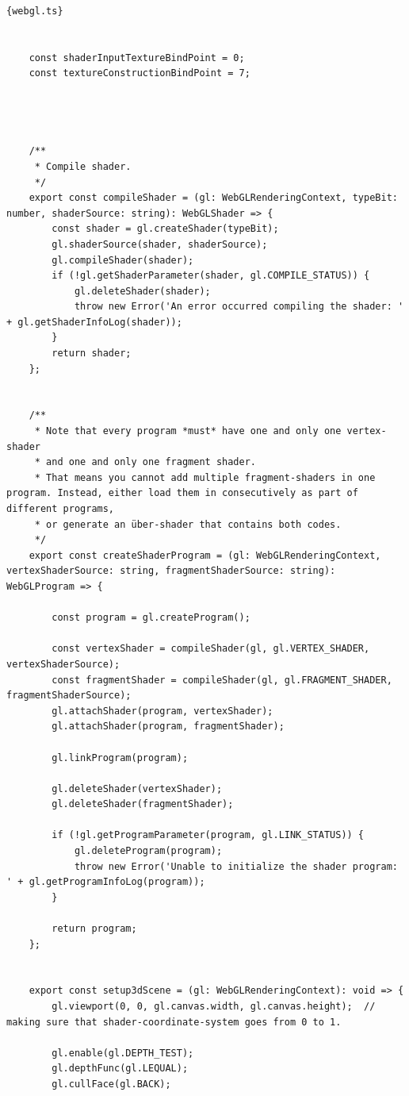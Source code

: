 \begin{lstlisting}{webgl.ts}
    
    
    const shaderInputTextureBindPoint = 0;
    const textureConstructionBindPoint = 7;
    
    
    
    
    /**
     * Compile shader.
     */
    export const compileShader = (gl: WebGLRenderingContext, typeBit: number, shaderSource: string): WebGLShader => {
        const shader = gl.createShader(typeBit);
        gl.shaderSource(shader, shaderSource);
        gl.compileShader(shader);
        if (!gl.getShaderParameter(shader, gl.COMPILE_STATUS)) {
            gl.deleteShader(shader);
            throw new Error('An error occurred compiling the shader: ' + gl.getShaderInfoLog(shader));
        }
        return shader;
    };
    
    
    /**
     * Note that every program *must* have one and only one vertex-shader
     * and one and only one fragment shader.
     * That means you cannot add multiple fragment-shaders in one program. Instead, either load them in consecutively as part of different programs,
     * or generate an über-shader that contains both codes.
     */
    export const createShaderProgram = (gl: WebGLRenderingContext, vertexShaderSource: string, fragmentShaderSource: string): WebGLProgram => {
    
        const program = gl.createProgram();
    
        const vertexShader = compileShader(gl, gl.VERTEX_SHADER, vertexShaderSource);
        const fragmentShader = compileShader(gl, gl.FRAGMENT_SHADER, fragmentShaderSource);
        gl.attachShader(program, vertexShader);
        gl.attachShader(program, fragmentShader);
    
        gl.linkProgram(program);
    
        gl.deleteShader(vertexShader);
        gl.deleteShader(fragmentShader);
    
        if (!gl.getProgramParameter(program, gl.LINK_STATUS)) {
            gl.deleteProgram(program);
            throw new Error('Unable to initialize the shader program: ' + gl.getProgramInfoLog(program));
        }
    
        return program;
    };
    
    
    export const setup3dScene = (gl: WebGLRenderingContext): void => {
        gl.viewport(0, 0, gl.canvas.width, gl.canvas.height);  // making sure that shader-coordinate-system goes from 0 to 1.
    
        gl.enable(gl.DEPTH_TEST);
        gl.depthFunc(gl.LEQUAL);
        gl.cullFace(gl.BACK);
    

\end{lstlisting}
